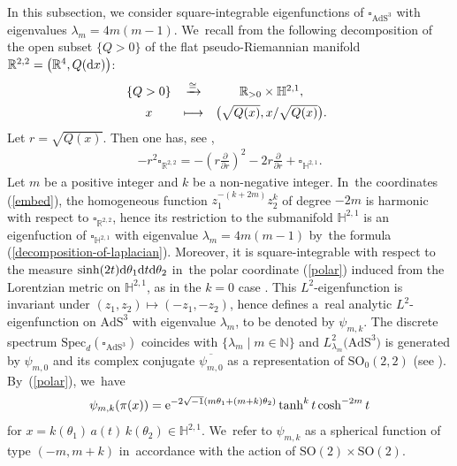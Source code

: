 \documentclass[pdftex]{sigma}
\numberwithin{equation}{section}
\begin{document}
In this subsection, we consider square-integrable eigenfunctions of
$\square_{\mathrm{AdS}^{3}}$ with eigenvalues $\lambda_{m}=4m(m-1)$. We~recall from \cite[Section~9]{KaKob16} the following decomposition of the open subset $\{Q > 0\}$ of
the flat pseudo-Riemannian manifold $\mathbb{R}^{2,2}=\big(\mathbb{R}^{4},Q({\rm d}x)\big)$:
\begin{align*}
\begin{array}{@{}ccc}
\{Q > 0\} & \xrightarrow{\cong} & \mathbb{R}_{>0} \times \mathbb{H}^{2,1}, \\[1ex]
x & \longmapsto & \big(\sqrt{Q(x)}, x/\sqrt{Q(x)}\big).
\end{array}
\end{align*}
Let $r=\sqrt{Q(x)}$. Then one has, see \cite[p.~215]{KaKob16},
\begin{align}
\label{decomposition-of-laplacian}
-r^2\square_{\mathbb{R}^{2,2}} = -\left(r\frac{\partial}{\partial r}\right)^2 - 2r\frac{\partial}{\partial r} + \square_{\mathbb{H}^{2,1}}.
\end{align}
Let $m$ be a positive integer and $k$ be a non-negative integer. In~the coordinates (\ref{embed}),
the homogeneous function $z_{1}^{-(k+2m)}z_{2}^{k}$ of degree $-2m$
 is harmonic with respect to $\square_{\mathbb{R}^{2,2}}$,
hence its restriction to the submanifold $\mathbb{H}^{2,1}$ is
an eigenfuction of $\square_{\mathbb{H}^{2,1}}$ with eigenvalue $\lambda_{m}=4m(m-1)$
by~the formula (\ref{decomposition-of-laplacian}).
Moreover, it is square-integrable with respect to the measure
$\sinh(2t){\rm d}\theta_{1}{\rm d}t{\rm d}\theta_{2}$ in~the polar coordinate (\ref{polar})
induced from the Lorentzian metric on $\mathbb{H}^{2,1}$,
as in the $k=0$ case \cite[Section~9]{KaKob16}.
This $L^{2}$-eigenfunction is invariant under $(z_{1},z_{2})\mapsto(-z_{1},-z_{2})$,
hence defines a~real analytic $L^{2}$-eigenfunction on $\mathrm{AdS}^{3}$
with eigenvalue $\lambda_{m}$, to be denoted by $\psi_{m,k}$.
The discrete spectrum
$\mathrm{Spec}_{d}(\square_{\mathrm{AdS}^{3}})$ coincides with
$\{\lambda_{m} \mid m \in \mathbb{N}\}$
and $L^{2}_{\lambda_{m}}\big(\mathrm{AdS}^{3}\big)$ is generated by
$\psi_{m,0}$ and its complex conjugate $\overline{\psi_{m,0}}$
as a representation of $\mathrm{SO}_{0}(2,2)$ (see \cite[Claim~9.12]{KaKob16}).
By~(\ref{polar}), we~have
\begin{align}
\label{polarFJ}
\psi_{m,k}(\pi(x))
= {\rm e}^{-2\sqrt{-1}(m\theta_1 + (m+k)\theta_2)}\tanh^{k}t\cosh^{-2m}t
\end{align}
for $x=k(\theta_1)\,a(t)\,k(\theta_2)\in\mathbb{H}^{2,1}$. We~refer to $\psi_{m,k}$ as a spherical function of type $(-m,m+k)$
in~accordance with the action of
$\mathrm{SO}(2)\times\mathrm{SO}(2)$.
\end{document}
